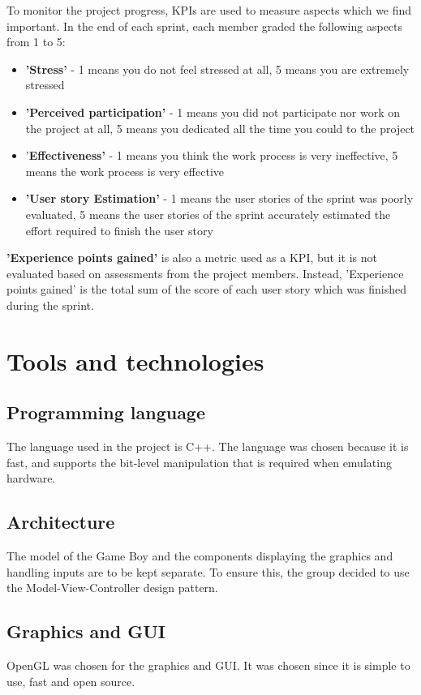 To monitor the project progress, KPIs are used to measure aspects which we find important. In the end of each sprint, each member graded the following aspects from 1 to 5:

\begin{itemize}
    \item \textbf{'Stress'} - 1 means you do not feel stressed at all, 5 means you are extremely stressed
    \item \textbf{'Perceived participation'} - 1 means you did not participate nor work on the project at all, 5 means you dedicated all the time you could to the project
    \item '\textbf{Effectiveness'} - 1 means you think the work process is very ineffective, 5 means the work process is very effective
    \item \textbf{'User story Estimation'} - 1 means the user stories of the sprint was poorly evaluated, 5 means the user stories of the sprint accurately estimated the effort required to finish the user story
\end{itemize}
    
\textbf{'Experience points gained'} is also a metric used as a KPI, but it is not evaluated based on assessments from the project members. Instead, 'Experience points gained' is the total sum of the score of each user story which was finished during the sprint.


\section{Tools and technologies}

\subsection{Programming language}
    The language used in the project is C++. The language was chosen because it is fast, and supports the bit-level manipulation that is required when emulating hardware.
\subsection{Architecture}
    The model of the Game Boy and the components displaying the graphics and handling inputs are to be kept separate. To ensure this, the group decided to use the Model-View-Controller design pattern.
\subsection{Graphics and GUI}
    OpenGL was chosen for the graphics and GUI. It was chosen since it is simple to use, fast and open source.
